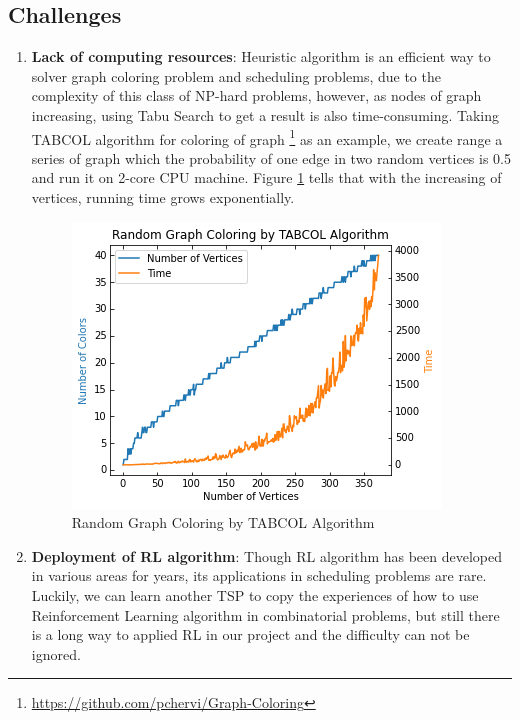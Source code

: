 \documentclass{article}
\begin{document}
\subsection{Challenges}
\begin{enumerate}
	\item \textbf{Lack of computing resources}: Heuristic algorithm is an efficient way to solver graph coloring problem and scheduling problems, due to the complexity of this class of NP-hard problems, however, as nodes of graph increasing, using Tabu Search to get a result is also time-consuming. Taking TABCOL algorithm for coloring of graph \footnote{\url{https://github.com/pchervi/Graph-Coloring}} as an example, we create range a series of graph which the probability of one edge in two random vertices is 0.5 and run it on 2-core CPU machine. Figure \ref{fig4} tells that with the increasing of vertices, running time grows exponentially.
	
	\begin{figure}[h]
		\centering
		\includegraphics[width=0.6\linewidth]{fig4.png}
		\caption{Random Graph Coloring by TABCOL Algorithm}\label{fig4}
	\end{figure}
	\item \textbf{Deployment of RL algorithm}: Though RL algorithm has been developed in various areas for years, its applications in scheduling problems are rare. Luckily, we can learn another TSP to copy the experiences of how to use Reinforcement Learning algorithm in combinatorial problems, but still there is a long way to applied RL in our project and the difficulty can not be ignored.
\end{enumerate}


\newpage



\end{document}
